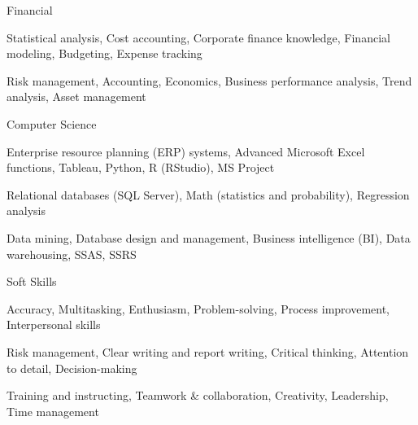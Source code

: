 \documentclass[11pt, a4paper]{awesome-cv}
\begin{document}
\begin{cvskills}

  \cvskill
    {Financial} %
    {
      \begin{cvitems}
        \item {Statistical analysis, Cost accounting, Corporate finance knowledge, Financial modeling, Budgeting, Expense tracking}
        \item {Risk management, Accounting, Economics, Business performance analysis, Trend analysis, Asset management}
      \end{cvitems}
    }

  \cvskill
    {Computer Science} %
    {
      \begin{cvitems} %
        \item {Enterprise resource planning (ERP) systems, Advanced Microsoft Excel functions, Tableau, Python, R (RStudio), MS Project}
        \item {Relational databases (SQL Server), Math (statistics and probability), Regression analysis}
        \item {Data mining, Database design and management, Business intelligence (BI), Data warehousing, SSAS, SSRS}
      \end{cvitems}
    }

  \cvskill
    {Soft Skills} %
    {
      \begin{cvitems} %
        \item {Accuracy, Multitasking, Enthusiasm, Problem-solving, Process improvement, Interpersonal skills}
        \item {Risk management, Clear writing and report writing, Critical thinking, Attention to detail, Decision-making}
        \item {Training and instructing, Teamwork \& collaboration, Creativity, Leadership, Time management}
      \end{cvitems}
    }

\end{cvskills}

\end{document}

